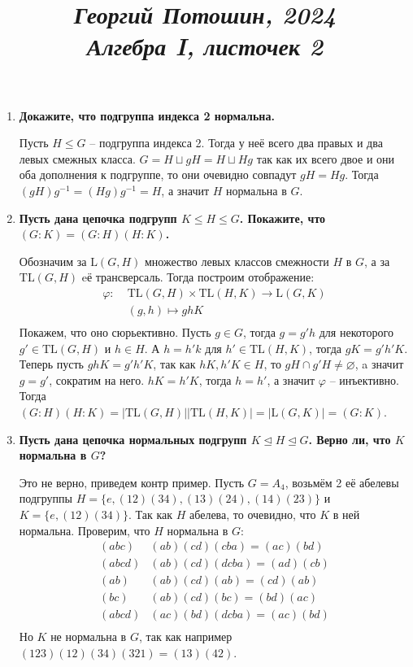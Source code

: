 \documentclass{article}
\title{
\textit{\small{Георгий Потошин, 2024}}\\
\vspace{0.3ex}
\textit{\huge{Алгебра I, листочек 2}}\vspace{1ex}
}
\date{\vspace{-10ex}}
\begin{document}
\maketitle

\begin{enumerate}
    \item \textbf{Докажите, что подгруппа индекса 2 нормальна.}

        Пусть $H\leq G$ – подгруппа индекса 2. Тогда у неё всего два правых и
        два левых смежных класса. $G=H\sqcup gH=H\sqcup Hg$ так как их всего
        двое и они оба дополнения к подгруппе, то они очевидно совпадут $gH=Hg$.
        Тогда $(gH)g^{-1}=(Hg)g^{-1}=H$, а значит $H$ нормальна в $G$.

    \item \textbf{Пусть дана цепочка подгрупп $K\leq H\leq G$. Покажите, что
        $(G:K)=(G:H)(H:K)$.}

        Обозначим за $\text{L}(G,H)$ множество левых классов смежности $H$ в $G$,
        а за $\text{TL}(G,H)$ eё трансверсаль. Тогда построим отображение:
        \begin{align*}
            \varphi:\;&\text{TL}(G,H)\times\text{TL}(H,K)\longrightarrow \text{L}(G, K)\\
            &(g,h)\mapsto ghK\\
        \end{align*}
        Покажем, что оно сюрьективно. Пусть $g\in G$, тогда $g=g'h$ для
        некоторого $g'\in\text{TL}(G,H)$ и $h\in H$. А $h=h'k$ для $h'\in
        \text{TL}(H,K)$, тогда $gK=g'h'K$. Теперь пусть $ghK=g'h'K$, так как
        $hK,h'K\in H$, то $gH\cap g'H\neq\varnothing$, a значит $g=g'$,
        сократим на него. $hK=h'K$, тогда $h=h'$, а значит $\varphi$ – инъективно. Тогда
        $(G:H)(H:K)=|\text{TL}(G,H)||\text{TL}(H,K)| = |\text{L}(G,K)|=(G:K)$.

    \item \textbf{Пусть дана цепочка нормальных подгрупп $K\trianglelefteq H\trianglelefteq
        G$. Верно ли, что $K$ нормальна в $G$?}

        Это не верно, приведем контр пример. Пусть $G=A_4$, возьмём 2 её абелевы
        подгруппы $H=\{e,(12)(34),(13)(24),(14)(23)\}$ и $K=\{e,(12)(34)\}$. Так
        как $H$ абелева, то очевидно, что $K$ в ней нормальна. Проверим, что
        $H$ нормальна в $G$:
        \begin{align*}
            (abc)&(ab)(cd)(cba)=(ac)(bd)\\
            (abcd)&(ab)(cd)(dcba)=(ad)(cb)\\
            (ab)&(ab)(cd)(ab)=(cd)(ab)\\
            (bc)&(ab)(cd)(bc)=(bd)(ac)\\
            (abcd)&(ac)(bd)(dcba)=(ac)(bd)\\
        \end{align*}
        Но $K$ не нормальна в $G$, так как например $(123)(12)(34)(321)=(13)(42)$.


\end{enumerate}
\end{document}
